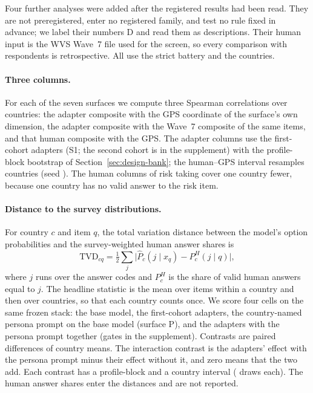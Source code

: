 Four further analyses were added after the registered results had been read. They are not preregistered, enter no registered family, and test no rule fixed in advance; we label their numbers D and read them as descriptions. Their human input is the WVS Wave~7 file used for the screen, so every comparison with respondents is retrospective. All use the strict battery and the  countries.

\paragraph{Three columns.} For each of the seven surfaces we compute three Spearman correlations over countries: the adapter composite with the GPS coordinate of the surface's own dimension, the adapter composite with the Wave~7 composite of the same items, and that human composite with the GPS. The adapter columns use the first-cohort adapters (S1; the second cohort is in the supplement) with the profile-block bootstrap of Section~\ref{sec:design-bank}; the human--GPS interval resamples countries (seed ). The human columns of risk taking cover one country fewer, because one country has no valid answer to the risk item.

\paragraph{Distance to the survey distributions.} For country $c$ and item $q$, the total variation distance between the model's option probabilities and the survey-weighted human answer shares is
\begin{equation*}
\mathrm{TVD}_{cq}=\tfrac{1}{2}\sum_j \bigl|\widehat{P}_c(j\mid x_q)-P^{H}_c(j\mid q)\bigr|,
\end{equation*}
where $j$ runs over the answer codes and $P^{H}_c$ is the share of valid human answers equal to $j$. The headline statistic is the mean over items within a country and then over countries, so that each country counts once. We score four cells on the same frozen stack: the base model, the first-cohort adapters, the country-named persona prompt on the base model (surface P), and the adapters with the persona prompt together (gates in the supplement). Contrasts are paired differences of country means. The interaction contrast is the adapters' effect with the persona prompt minus their effect without it, and zero means that the two add. Each contrast has a profile-block and a country interval ( draws each). The human answer shares enter the distances and are not reported.


